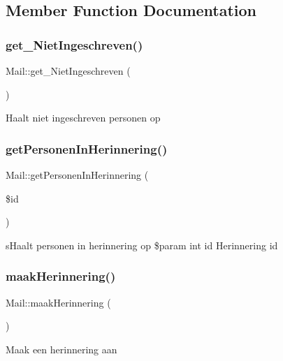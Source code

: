 \subsection{Member Function Documentation}
\mbox{\label{class_mail_a981094d50056d958426564d48c95cce1}} 
\subsubsection{\texorpdfstring{get\+\_\+\+Niet\+Ingeschreven()}{get\_NietIngeschreven()}}
{\footnotesize\ttfamily Mail\+::get\+\_\+\+Niet\+Ingeschreven (\begin{DoxyParamCaption}{ }\end{DoxyParamCaption})}

Haalt niet ingeschreven personen op \mbox{\label{class_mail_af56bb11351090ce865a284a2c27ef3bb}} 
\subsubsection{\texorpdfstring{get\+Personen\+In\+Herinnering()}{getPersonenInHerinnering()}}
{\footnotesize\ttfamily Mail\+::get\+Personen\+In\+Herinnering (\begin{DoxyParamCaption}\item[{}]{\$id }\end{DoxyParamCaption})}

s\+Haalt personen in herinnering op \$param int id Herinnering id \mbox{\label{class_mail_a51675a2d0d65414634e3a21067462014}} 
\subsubsection{\texorpdfstring{maak\+Herinnering()}{maakHerinnering()}}
{\footnotesize\ttfamily Mail\+::maak\+Herinnering (\begin{DoxyParamCaption}{ }\end{DoxyParamCaption})}

Maak een herinnering aan \mbox{\label{class_mail_abb72118b34523cae188c03dc72955d8c}} 
